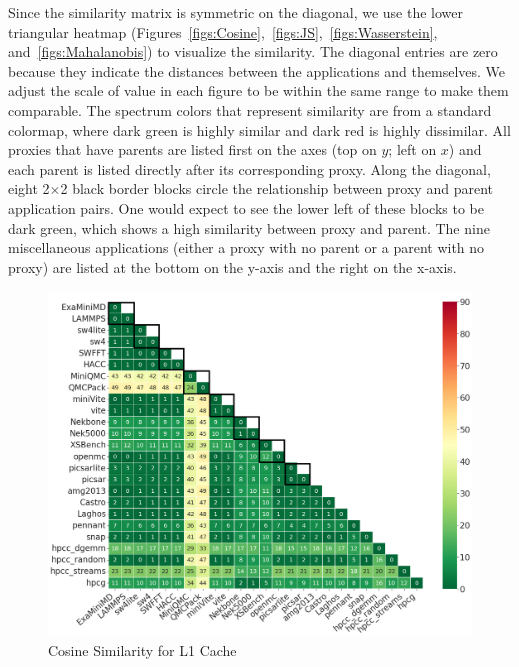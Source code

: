 Since the similarity matrix is symmetric on the diagonal, we use the lower triangular heatmap (Figures~\ref{figs:Cosine},~\ref{figs:JS},~\ref{figs:Wasserstein}, and~\ref{figs:Mahalanobis}) to visualize the similarity. The diagonal entries are zero because they indicate the distances between the applications and themselves. We adjust the scale of value in each figure to be within the same range to make them comparable. The spectrum colors that represent similarity are from a standard colormap, where dark green is highly similar and dark red is highly dissimilar. All proxies that have parents are listed first on the axes (top on $y$; left on $x$) and each parent is listed directly after its corresponding proxy. Along the diagonal, eight 2$\times$2 black border blocks circle the relationship between proxy and parent application pairs. One would expect to see the lower left of these blocks to be dark green, which shows a high similarity between proxy and parent. The nine miscellaneous applications (either a proxy with no parent or a parent with no proxy) are listed at the bottom on the y-axis and the right on the x-axis. 
\begin{figure}[ht]
\centering
\includegraphics[width=0.9\linewidth]{figs/L1_Cache_font20.png}
\caption{Cosine Similarity for L1 Cache }
\label{figs:cosine L1_D_Cache}
\end{figure}

